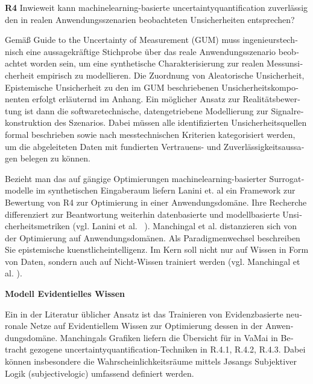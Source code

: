 \begin{otherlanguage}{ngerman}
\textbf{R4} Inwieweit kann \gls{machinelearning}-basierte \gls{uncertaintyquantification} zuverlässig den in realen Anwendungsszenarien beobachteten Unsicherheiten entsprechen?
\par\vspace{1\baselineskip}\noindent

Gemäß \glqq{}Guide to the Uncertainty of Measurement\grqq{} (GUM) muss ingenieurstechnisch eine aussagekräftige Stichprobe über das reale Anwendungsszenario beobachtet worden sein, um eine synthetische Charakterisierung zur realen Messunsicherheit empirisch zu modellieren. Die Zuordnung von \gls{Aleatorische Unsicherheit}, \gls{Epistemische Unsicherheit} zu den im GUM beschriebenen Unsicherheitskomponenten erfolgt erläuternd im Anhang. Ein möglicher Ansatz zur Realitätsbewertung ist dann die softwaretechnische, datengetriebene Modellierung zur Signalrekonstruktion des Szenarios. Dabei müssen alle identifizierten Unsicherheitsquellen formal beschrieben sowie nach messtechnischen Kriterien kategorisiert werden, um die abgeleiteten Daten mit fundierten Vertrauens- und Zuverlässigkeitsaussagen belegen zu können.

Bezieht man das auf gängige Optimierungen \gls{machinelearning}-basierter Surrogatmodelle im synthetischen Eingaberaum liefern Lanini et. al ein Framework zur Bewertung von R4 zur Optimierung in einer Anwendungsdomäne. Ihre Recherche differenziert zur Beantwortung weiterhin datenbasierte und modellbasierte Unsicherheitsmetriken (vgl. Lanini et al. ~\parencite{Lanini2024}). 
\newline
Manchingal et al. distanzieren sich von der Optimierung auf Anwendungsdomänen. Als Paradigmenwechsel beschreiben Sie epistemische \gls{kuenstlicheintelligenz}. Im Kern soll nicht nur auf Wissen in Form von Daten, sondern auch auf Nicht-Wissen trainiert werden (vgl. Manchingal et al. \parencite{manchingal2025}). 


\pagebreak


\textbf{Modell Evidentielles Wissen}

Ein in der Literatur üblicher Ansatz ist das Trainieren von \gls{Evidenzbasierte neuronale Netze} auf Evidentiellem Wissen zur Optimierung dessen in der Anwendungsdomäne. Manchingals Grafiken liefern die Übersicht für in VaMai in Betracht gezogene \gls{uncertaintyquantification}-Techniken in R.4.1, R.4.2, R.4.3. Dabei können insbesondere die Wahrscheinlichkeitsräume mittels Jøsangs Subjektiver Logik (\gls{subjectivelogic}) umfassend definiert werden. 


\end{otherlanguage}
